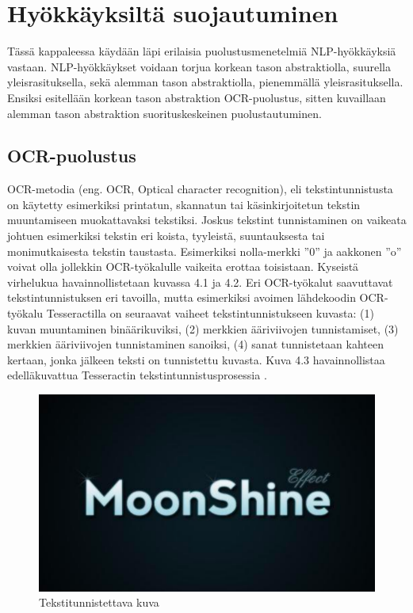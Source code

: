 \chapter{Hyökkäyksiltä suojautuminen\label{discussion}}

Tässä kappaleessa käydään läpi erilaisia puolustusmenetelmiä NLP-hyökkäyksiä vastaan. NLP-hyökkäykset voidaan torjua korkean tason abstraktiolla, suurella yleisrasituksella, sekä alemman tason abstraktiolla, pienemmällä yleisrasituksella. Ensiksi esitellään korkean tason abstraktion OCR-puolustus, sitten kuvaillaan alemman tason abstraktion suorituskeskeinen puolustautuminen.

\section{OCR-puolustus}
OCR-metodia (eng. OCR, Optical character recognition), eli tekstintunnistusta on käytetty esimerkiksi printatun, skannatun tai käsinkirjoitetun tekstin muuntamiseen muokattavaksi tekstiksi. Joskus tekstint tunnistaminen on vaikeata johtuen esimerkiksi tekstin eri koista, tyyleistä, suuntauksesta tai monimutkaisesta tekstin taustasta. Esimerkiksi nolla-merkki ''0'' ja aakkonen ''o'' voivat olla jollekkin OCR-työkalulle vaikeita erottaa toisistaan. Kyseistä virhelukua havainnollistetaan kuvassa 4.1 ja 4.2. Eri OCR-työkalut saavuttavat tekstintunnistuksen eri tavoilla, mutta esimerkiksi avoimen lähdekoodin OCR-työkalu Tesseractilla on seuraavat vaiheet tekstintunnistukseen kuvasta: (1) kuvan muuntaminen binäärikuviksi, (2) merkkien ääriviivojen tunnistamiset, (3) merkkien ääriviivojen tunnistaminen sanoiksi, (4) sanat tunnistetaan kahteen kertaan, jonka jälkeen teksti on tunnistettu kuvasta. Kuva 4.3 havainnollistaa edelläkuvattua Tesseractin tekstintunnistusprosessia \citep{tesseractocr}.

\begin{figure}[t]
  \includegraphics[scale=0.6]{figures/moonshine.png}
  \caption{Tekstitunnistettava kuva \citep{tesseractocr}}
\end{figure}

